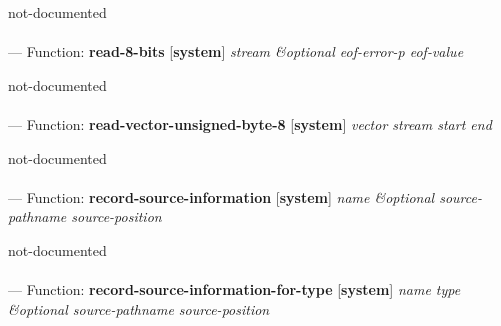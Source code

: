 \begin{adjustwidth}{5em}{5em}
not-documented
\end{adjustwidth}

\paragraph{}
\label{SYSTEM:READ-8-BITS}
--- Function: \textbf{read-8-bits} [\textbf{system}] \textit{stream \&optional eof-error-p eof-value}

\begin{adjustwidth}{5em}{5em}
not-documented
\end{adjustwidth}

\paragraph{}
\label{SYSTEM:READ-VECTOR-UNSIGNED-BYTE-8}
--- Function: \textbf{read-vector-unsigned-byte-8} [\textbf{system}] \textit{vector stream start end}

\begin{adjustwidth}{5em}{5em}
not-documented
\end{adjustwidth}

\paragraph{}
\label{SYSTEM:RECORD-SOURCE-INFORMATION}
--- Function: \textbf{record-source-information} [\textbf{system}] \textit{name \&optional source-pathname source-position}

\begin{adjustwidth}{5em}{5em}
not-documented
\end{adjustwidth}

\paragraph{}
\label{SYSTEM:RECORD-SOURCE-INFORMATION-FOR-TYPE}
--- Function: \textbf{record-source-information-for-type} [\textbf{system}] \textit{name type \&optional source-pathname source-position}

